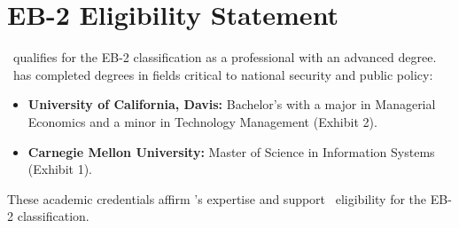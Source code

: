 \documentclass{pl_template}  %
\begin{document}

\newpage  %
\otherpagesheader  %
\tableofcontents
\section{EB-2 Eligibility Statement}
\Petitioner \  qualifies for the EB-2 classification as a professional with an advanced degree. \HeSheUp \ has completed degrees in fields critical to national security and public policy: 
\begin{itemize}
    \item \textbf{University of California, Davis:} Bachelor’s with a major in Managerial Economics and a minor in Technology Management (Exhibit 2).
    \item \textbf{Carnegie Mellon University:} Master of Science in Information Systems (Exhibit 1). 
\end{itemize}
These academic credentials affirm \Petitioner’s expertise and support \HisHerLow \ eligibility for the EB-2 classification.




\vspace{2em}
 
\end{document}
